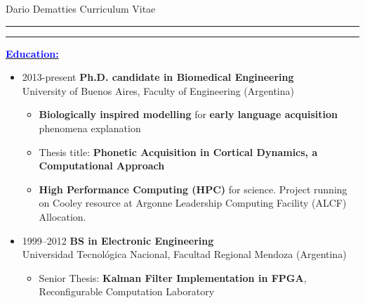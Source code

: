 \documentclass{article}
\newcommand{\soptitle}{Dario Dematties Curriculum Vitae}
\newcommand{\yourname}{Dario Dematties Application to}
\newcommand{\statement}[1]{\par\medskip
  \underline{\textcolor{blue}{\textbf{#1:}}}\space
}
\begin{document}
\begin{center}
\LARGE \soptitle\\


\end{center}

\hrule
\vspace{1pt}
\hrule height 1pt

\bigskip


\statement{Education}
\begin{itemize}
	\item 2013-present {\bf Ph.D. candidate in Biomedical Engineering}\\
University of Buenos Aires, Faculty of Engineering (Argentina)
\begin{itemize}
	\item \textbf{Biologically inspired modelling} for \textbf{early language acquisition} phenomena explanation
	\item Thesis title: \textbf{Phonetic Acquisition in Cortical Dynamics, a Computational Approach}
	\item \textbf{High Performance Computing (HPC)} for science. Project running on Cooley resource at Argonne Leadership Computing Facility (ALCF) Allocation.
\end{itemize}


\item 1999--2012 {\bf BS in Electronic Engineering}\\
Universidad Tecnol\'ogica Nacional, Facultad Regional Mendoza (Argentina)
\begin{itemize}
	\item Senior Thesis: \textbf{Kalman Filter Implementation in FPGA}, Reconfigurable Computation Laboratory
\end{itemize}
\end{itemize}
\end{document}
